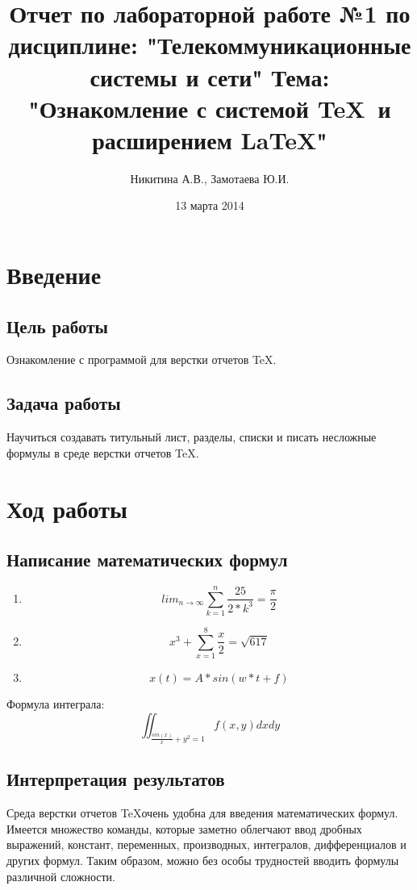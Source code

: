 \documentclass[10pt,a4paper]{report}
\author{Никитина А.В., Замотаева Ю.И.}
\title{Отчет по лабораторной работе №1 по дисциплине: "Телекоммуникационные системы и сети"\newline
Тема: "Ознакомление с системой \TeX\ и расширением \LaTeX "}
\date{13 марта 2014}
\begin{document}
\maketitle
\pagebreak
\chapter{Введение}
\section{Цель работы}
Ознакомление с программой для верстки отчетов \TeX.
\section{Задача работы}
Научиться создавать титульный лист, разделы, списки и писать несложные формулы в среде верстки отчетов \TeX.
\chapter{Ход работы}
\section{Написание математических формул}
\begin{enumerate}
\item
\begin{displaymath}
lim_{n \to \infty}
\sum_{k=1}^n \frac{25}{2*k^3}
= \frac{\pi}{2}
\end{displaymath}
\item 
\begin{displaymath}
x^{3}+\sum_{x=1}^8 \frac{x}{2}
= \sqrt{617}
\end{displaymath}
\item 
\begin{displaymath}
x(t) = A * sin(w*t+f)
\end{displaymath}
\end{enumerate}
Формула интеграла:
\begin{displaymath}
\iint_{\frac{sin(x)}{x}+y^{2} = 1} f(x, y) dx dy 
\end{displaymath}
\section{Интерпретация результатов}
Среда верстки отчетов \TeX очень удобна для введения математических формул. Имеется множество команды, которые заметно облегчают ввод дробных выражений, констант, переменных, производных, интегралов, дифференциалов и других формул. Таким образом, можно без особы трудностей вводить формулы различной сложности.
\end{document}
